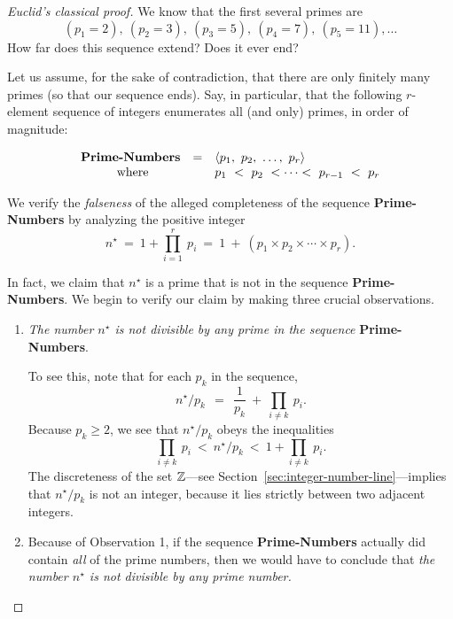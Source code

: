 \begin{proof} [Euclid's classical proof]
We know that the first several primes are
\[ (p_1 =2), \ (p_2 = 3), \ (p_3 =5), \ (p_4 = 7), \ (p_5 =11), \ldots \] 
How far does this sequence extend?  Does it ever end?

\medskip

Let us assume, for the sake of contradiction, that there are only finitely many primes (so that our sequence ends).  Say, in particular, that the following $r$-element sequence of integers enumerates all (and only) primes, in order of magnitude:

\smallskip

\[ \begin{array}{ccl}
\mbox{\bf Prime-Numbers} & = & 
\langle p_1, \ p_2, \ \ldots, \ p_r \rangle \\
\mbox{ where} &  &
p_1 \ < \ p_2 \ < \cdots < \ p_{r-1} \ < \ p_r
\end{array}
\]

\smallskip

We verify the {\em falseness} of the alleged completeness of the sequence {\bf Prime-Numbers} by analyzing the positive integer
\[
n^\star \ = \ 1 + \prod_{i=1}^r \ p_i \ = \ 1 \ + \ \left(p_1 \times p_2 \times \cdots \times p_r \right).
\]

In fact, we claim that $n^\star$ is a prime that is not in the sequence {\bf Prime-Numbers}.  We begin to verify our claim by making three crucial observations.
\begin{enumerate}
\item
{\em The number $n^\star$ is not divisible by any prime in the sequence} {\bf Prime-Numbers}.

\smallskip

To see this, note that for each $p_k$ in the sequence,
\[ n^\star / p_k \ \ = \ \ \frac{1}{p_k} \ + \ \prod_{i \neq k} \ p_i .  \]
Because $p_k \geq 2$, we see that $n^\star / p_k$ obeys the inequalities
\[  \prod_{i \neq k} \ p_i \ < \ n^\star /p_k \ < \ 1 + \prod_{i \neq k} \ p_i.  \] 
The discreteness of the set $\mathbb{Z}$---see Section~\ref{sec:integer-number-line}---implies that $n^\star / p_k$ is not an integer, because it lies strictly between two adjacent integers.

\medskip\item
Because of Observation 1, if the sequence {\bf Prime-Numbers} actually did contain {\em all} of the prime numbers, then we would have to conclude that {\em the number $n^\star$ is not divisible by any prime number.}


\end{enumerate}
\end{proof}
